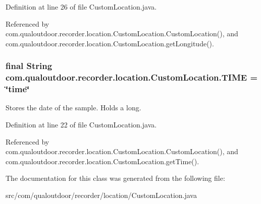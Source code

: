 Definition at line 26 of file Custom\-Location.\-java.



Referenced by com.\-qualoutdoor.\-recorder.\-location.\-Custom\-Location.\-Custom\-Location(), and com.\-qualoutdoor.\-recorder.\-location.\-Custom\-Location.\-get\-Longitude().

\hypertarget{classcom_1_1qualoutdoor_1_1recorder_1_1location_1_1CustomLocation_a4fef2ee705e7d09bc57f473d44907c74}{
\subsubsection[{T\-I\-M\-E}]{\setlength{\rightskip}{0pt plus 5cm}final String com.\-qualoutdoor.\-recorder.\-location.\-Custom\-Location.\-T\-I\-M\-E = \char`\"{}time\char`\"{}\hspace{0.3cm}{\ttfamily [static]}}}\label{classcom_1_1qualoutdoor_1_1recorder_1_1location_1_1CustomLocation_a4fef2ee705e7d09bc57f473d44907c74}
Stores the date of the sample. Holds a long. 

Definition at line 22 of file Custom\-Location.\-java.



Referenced by com.\-qualoutdoor.\-recorder.\-location.\-Custom\-Location.\-Custom\-Location(), and com.\-qualoutdoor.\-recorder.\-location.\-Custom\-Location.\-get\-Time().



The documentation for this class was generated from the following file\-:\begin{DoxyCompactItemize}
\item 
src/com/qualoutdoor/recorder/location/Custom\-Location.\-java\end{DoxyCompactItemize}
